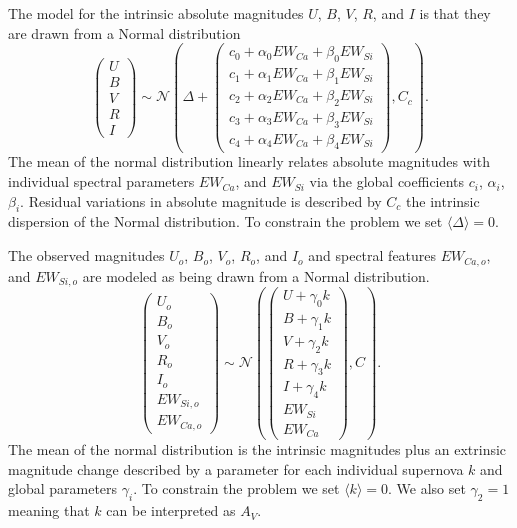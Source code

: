 \documentclass[11pt, oneside]{article}   	%
\begin{document}
The model for the intrinsic absolute magnitudes $U$, $B$, $V$, $R$, and $I$ is that they are drawn from a Normal distribution
\begin{equation*}
\left(
\begin{matrix}
U\\B\\V\\R\\I
\end{matrix}
\right) \sim \mathcal{N}
\left(
\Delta +
\left(
\begin{matrix}
c_0+\alpha_0 EW_{Ca} + \beta_0 EW_{Si} \\
c_1+\alpha_1 EW_{Ca} + \beta_1 EW_{Si}  \\
c_2+\alpha_2 EW_{Ca} + \beta_2 EW_{Si} \\
c_3+\alpha_3 EW_{Ca} + \beta_3 EW_{Si} \\
c_4+\alpha_4 EW_{Ca} + \beta_4 EW_{Si}
\end{matrix}
\right)
,C_{c}
\right).
\end{equation*}
The mean of the normal distribution linearly relates absolute magnitudes with
individual spectral parameters  $EW_{Ca}$, and $EW_{Si}$ via the  global coefficients
 $c_i$, $\alpha_i$, $\beta_i$.  Residual variations in absolute magnitude is described
 by  $C_c$ the intrinsic dispersion of the Normal distribution.  To constrain the problem we
 set $\langle \Delta \rangle=0$.

The observed magnitudes  $U_o$, $B_o$, $V_o$, $R_o$, and $I_o$  and spectral features  $EW_{Ca,o}$, and $EW_{Si,o}$ are modeled
as being drawn from a Normal distribution. 
\begin{equation*}
\left(
\begin{matrix}
U_o\\B_o\\ V_o\\R_o\\I_o\\EW_{Si, o}\\ EW_{Ca, o}
\end{matrix}
\right) \sim \mathcal{N}
\left(
\left(
\begin{matrix}
U +\gamma_0 k \\B +\gamma_1 k \\V+\gamma_2 k\\R+\gamma_3 k\\I+\gamma_4 k\\
EW_{Si}\\ EW_{Ca}
\end{matrix}
\right)
,C
\right).
\end{equation*}
The mean of the normal distribution is the intrinsic magnitudes plus an extrinsic magnitude change described by a parameter for each individual supernova
$k$ and global parameters $\gamma_i$.  
To constrain the problem we set  $\langle k \rangle=0$.  We also set  $\gamma_2=1$ meaning that $k$ can be interpreted as $A_V$.
\end{document}
